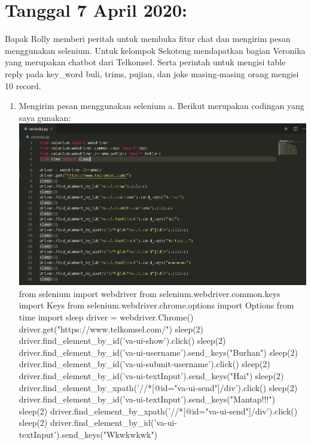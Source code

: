 \documentclass{article}
\begin{document}
\section{Tanggal 7 April 2020:}
Bapak Rolly memberi peritah untuk membuka fitur chat dan mengirim pesan menggunakan selenium. Untuk kelompok Sekoteng mendapatkan bagian Veronika yang merupakan chatbot dari Telkomsel. Serta perintah untuk mengisi table reply pada key\_word buli, trims, pujian, dan joke masing-masing orang mengisi 10 record.
	\newline 
	\begin{enumerate}
		\item Mengirim pesan menggunakan selenium
			\newline
			a. Berikut merupakan codingan yang saya gunakan:
			\newline
			\includegraphics[scale=0.4]{38.1a.jpg}
			\newline
			from selenium import webdriver
			from selenium.webdriver.common.keys import Keys
			from selenium.webdriver.chrome.options import Options
			from time import sleep
			\newline
			driver = webdriver.Chrome()
			driver.get("https://www.telkomsel.com/")
			sleep(2)
			driver.find\_element\_by\_id('va-ui-show').click()
			sleep(2)
			driver.find\_element\_by\_id('va-ui-username').send\_keys("Burhan")
			sleep(2)
			driver.find\_element\_by\_id('va-ui-submit-username').click()
			sleep(2)
			driver.find\_element\_by\_id('va-ui-textInput').send\_keys("Hai")
			sleep(2)
			driver.find\_element\_by\_xpath('//*[@id="va-ui-send"]/div').click()
			sleep(2)
			driver.find\_element\_by\_id('va-ui-textInput').send\_keys("Mantap!!!")
			sleep(2)
			driver.find\_element\_by\_xpath('//*[@id="va-ui-send"]/div').click()
			sleep(2)
			driver.find\_element\_by\_id('va-ui-textInput').send\_keys("Wkwkwkwk")

\end{enumerate}
\end{document}
